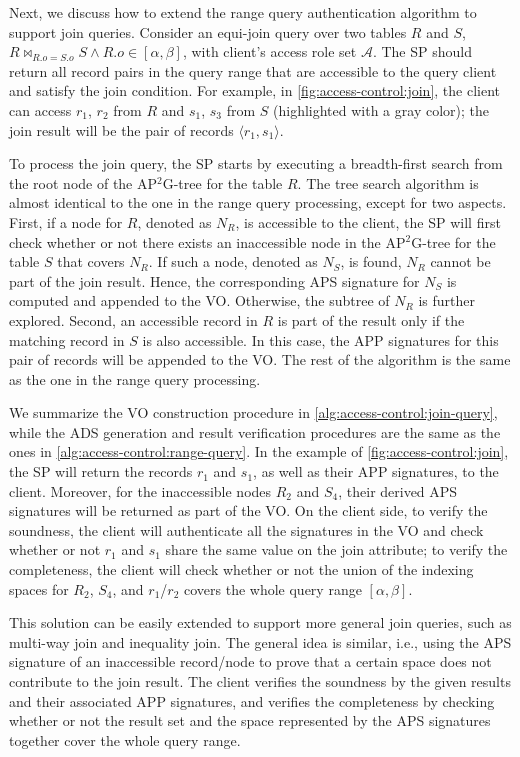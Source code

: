 Next, we discuss how to extend the range query authentication algorithm to support join queries. Consider an equi-join query over two tables $R$ and $S$, $R \Join_{R.o = S.o} S \land R.o \in [\alpha, \beta]$, with client's access role set $\mathcal{A}$. The SP should return all record pairs in the query range that are accessible to the query client and satisfy the join condition.
For example, in \cref{fig:access-control:join}, the client can access $r_1$, $r_2$ from $R$ and $s_1$, $s_3$ from $S$ (highlighted with a gray color); the join result will be the pair of records $\langle r_1, s_1\rangle$.

To process the join query, the SP starts by executing a breadth-first search from the root node of the AP$^2$G-tree for the table $R$. The tree search algorithm is almost identical to the one in the range query processing, except for two aspects. First, if a node for $R$, denoted as $N_R$, is accessible to the client, the SP will first check whether or not there exists an inaccessible node in the AP$^2$G-tree for the table $S$ that covers $N_R$. If such a node, denoted as $N_S$, is found, $N_R$ cannot be part of the join result. Hence, the corresponding APS signature for $N_S$ is computed and appended to the VO\@. Otherwise, the subtree of $N_R$ is further explored. Second, an accessible record in $R$ is part of the result only if the matching record in $S$ is also accessible. In this case, the APP signatures for this pair of records will be appended to the VO\@. The rest of the algorithm is the same as the one in the range query processing.

We summarize the VO construction procedure in \cref{alg:access-control:join-query}, while the ADS generation and result verification procedures are the same as the ones in \cref{alg:access-control:range-query}.
In the example of \cref{fig:access-control:join}, the SP will return the records $r_1$ and $s_1$, as well as their APP signatures, to the client. Moreover, for the inaccessible nodes $R_2$ and $S_4$, their derived APS signatures will be returned as part of the VO\@. On the client side, to verify the soundness, the client will authenticate all the signatures in the VO and check whether or not $r_1$ and $s_1$ share the same value on the join attribute; to verify the completeness, the client will check whether or not the union of the indexing spaces for $R_2$, $S_4$, and $r_1$/$r_2$ covers the whole query range $[\alpha,\beta]$.

This solution can be easily extended to support more general join queries, such as multi-way join and inequality join. The general idea is similar, i.e., using the APS signature of an inaccessible record/node to prove that a certain space does not contribute to the join result. The client verifies the soundness by the given results and their associated APP signatures, and verifies the completeness by checking whether or not the result set and the space represented by the APS signatures together cover the whole query range.

